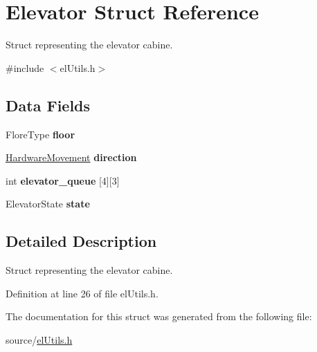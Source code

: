\hypertarget{structElevator}{}\section{Elevator Struct Reference}
\label{structElevator}


Struct representing the elevator cabine.  




{\ttfamily \#include $<$el\+Utils.\+h$>$}

\subsection*{Data Fields}
\begin{DoxyCompactItemize}
\item 
\mbox{\label{structElevator_ae52fd8b99f21d281c58194ab1734ddc5}} 
Flore\+Type {\bfseries floor}
\item 
\mbox{\label{structElevator_a5bc377c8e13b288861cc2e67866e9a5c}} 
\hyperlink{hardware_8h_a2167c399a24df296afc432bcb88228af}{Hardware\+Movement} {\bfseries direction}
\item 
\mbox{\label{structElevator_a92134b58a13b924fba94f145b9475b72}} 
int {\bfseries elevator\+\_\+queue} \mbox{[}4\mbox{]}\mbox{[}3\mbox{]}
\item 
\mbox{\label{structElevator_ab576b8da1f8fcb53cfdaef5019fac0a6}} 
Elevator\+State {\bfseries state}
\end{DoxyCompactItemize}


\subsection{Detailed Description}
Struct representing the elevator cabine. 

Definition at line 26 of file el\+Utils.\+h.



The documentation for this struct was generated from the following file\+:\begin{DoxyCompactItemize}
\item 
source/\hyperlink{elUtils_8h}{el\+Utils.\+h}\end{DoxyCompactItemize}
